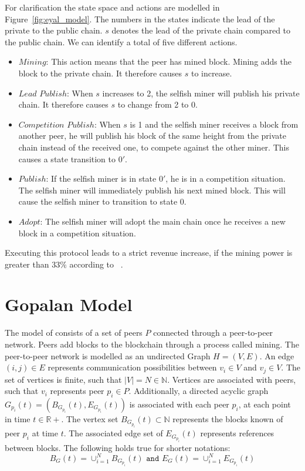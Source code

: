 For clarification the state space and actions are modelled in Figure~\ref{fig:eyal_model}. The numbers in the states indicate the lead of the private to the public chain. $s$ denotes the lead of the private chain compared to the public chain. We can identify a total of five different actions.
\begin{itemize}
\item $Mining$: This action means that the peer has mined block. Mining adds the block to the private chain. It therefore causes $s$ to increase.
\item $Lead$ $Publish$: When $s$ increases to 2, the selfish miner will publish his private chain. It therefore causes $s$ to change from 2 to 0.
\item $Competition$ $Publish$: When $s$ is 1 and the selfish miner receives a block from another peer, he will publish his block of the same height from the private chain instead of the received one, to compete against the other miner. This causes a state transition to $0'$.
\item $Publish$: If the selfish miner is in state $0'$, he is in a competition situation.
The selfish miner will immediately publish his next mined block. This will cause the selfish miner to transition to state $0$.
\item $Adopt$: The selfish miner will adopt the main chain once he receives a new block in a competition situation.
\end{itemize}
Executing this protocol leads to a strict revenue increase, if the mining power is greater than $33\%$ according to \citeauthor{eyal}~\cite{eyal}.


\section{Gopalan Model}\label{gopalan}
The model of \citeauthor{gopalan} consists of a set of peers $P$ connected through a peer-to-peer network. Peers add blocks to the blockchain through a process called mining. 
The peer-to-peer network is modelled as an undirected Graph $H = (V,E)$.
An edge $(i,j) \in E$ represents communication possibilities between $v_i \in V$ and $v_j \in V$. 
The set of vertices is finite, such that $|V|=N \in \mathbb{N}$.
Vertices are associated with peers, such that $v_i$ represents peer $p_i \in P$.
Additionally, a directed acyclic graph $G_{p_i}(t) = (B_{G_{p_i}}(t),E_{G_{p_i}}(t))$ is associated with each peer $p_i$, at each point in time $t \in \mathbb{R+}$.
The vertex set $B_{G_{p_i}}(t) \subset \mathbb{N}$ represents the blocks known of peer $p_i$ at time $t$. The associated edge set of $E_{G_{p_i}}(t)$ represents references between blocks.
The following holds true for shorter notations:
\begin{equation}
B_G(t) = \cup_{i=1}^N B_{G_{p_i}}(t) \texttt{ and } E_G(t) = \cup_{i=1}^N E_{G_{p_i}}(t)
\end{equation}

